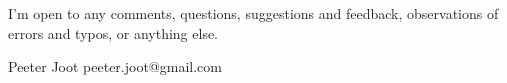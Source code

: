 %
%
%

I'm open to any comments, questions, suggestions and feedback,
observations of errors and typos, or anything else.

Peeter Joot  \quad peeter.joot@gmail.com 
